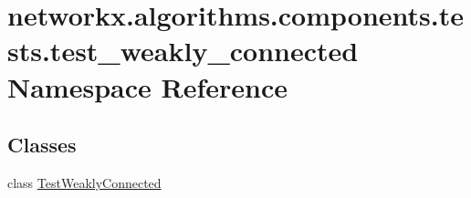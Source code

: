 \hypertarget{namespacenetworkx_1_1algorithms_1_1components_1_1tests_1_1test__weakly__connected}{}\section{networkx.\+algorithms.\+components.\+tests.\+test\+\_\+weakly\+\_\+connected Namespace Reference}
\label{namespacenetworkx_1_1algorithms_1_1components_1_1tests_1_1test__weakly__connected}
\subsection*{Classes}
\begin{DoxyCompactItemize}
\item 
class \hyperlink{classnetworkx_1_1algorithms_1_1components_1_1tests_1_1test__weakly__connected_1_1TestWeaklyConnected}{Test\+Weakly\+Connected}
\end{DoxyCompactItemize}
